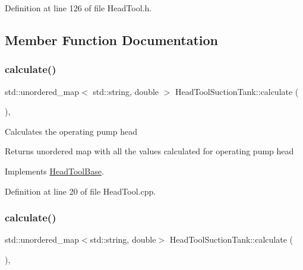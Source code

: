 Definition at line 126 of file Head\+Tool.\+h.



\subsection{Member Function Documentation}
\mbox{\label{class_head_tool_suction_tank_a390a38466222aa3b87d2cf2ec84537a5}} 
\subsubsection{\texorpdfstring{calculate()}{calculate()}\hspace{0.1cm}{\footnotesize\ttfamily [1/3]}}
{\footnotesize\ttfamily std\+::unordered\+\_\+map$<$ std\+::string, double $>$ Head\+Tool\+Suction\+Tank\+::calculate (\begin{DoxyParamCaption}{ }\end{DoxyParamCaption})\hspace{0.3cm}{\ttfamily [override]}, {\ttfamily [virtual]}}

Calculates the operating pump head \begin{DoxyReturn}{Returns}
unordered map with all the values calculated for operating pump head 
\end{DoxyReturn}


Implements \hyperlink{class_head_tool_base_ab8df8f908827ce45dc5e769ea0e10f0b}{Head\+Tool\+Base}.



Definition at line 20 of file Head\+Tool.\+cpp.

\mbox{\label{class_head_tool_suction_tank_a7e4a6931caa7c9be43992aecdfb80bec}} 
\subsubsection{\texorpdfstring{calculate()}{calculate()}\hspace{0.1cm}{\footnotesize\ttfamily [2/3]}}
{\footnotesize\ttfamily std\+::unordered\+\_\+map$<$std\+::string, double$>$ Head\+Tool\+Suction\+Tank\+::calculate (\begin{DoxyParamCaption}{ }\end{DoxyParamCaption})\hspace{0.3cm}{\ttfamily [override]}, {\ttfamily [virtual]}}

